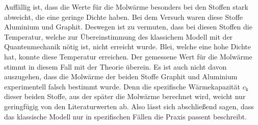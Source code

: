 Auffällig ist, dass die Werte für die Molwärme besonders bei den Stoffen stark abweicht, die eine geringe Dichte haben.
Bei dem Versuch waren diese Stoffe Aluminium und Graphit.
Deswegen ist zu vermuten, dass bei diesen Stoffen die Temperatur, welche zur Übereinstimmung des klassichem Modell mit der Quantenmechanik nötig ist, nicht erreicht wurde.
Blei, welche eine hohe Dichte hat, konnte diese Temperatur erreichen. 
Der gemessene Wert für die Molwärme stimmt in diesem Fall mit der Theorie überein.
Es ist auch nicht davon auszugehen, dass die Molwärme der beiden Stoffe Graphit und Aluminium experimentell falsch bestimmt wurde.
Denn die spezifische Wärmekapazität $c_\text{k}$ dieser beiden Stoffe, aus der später die Molwärme berechnet wird, weicht nur geringfügig von den Literaturwerten ab.
Also lässt sich abschließend sagen, dass das klassische Modell nur in spezifischen Fällen die Praxis passent beschreibt.
